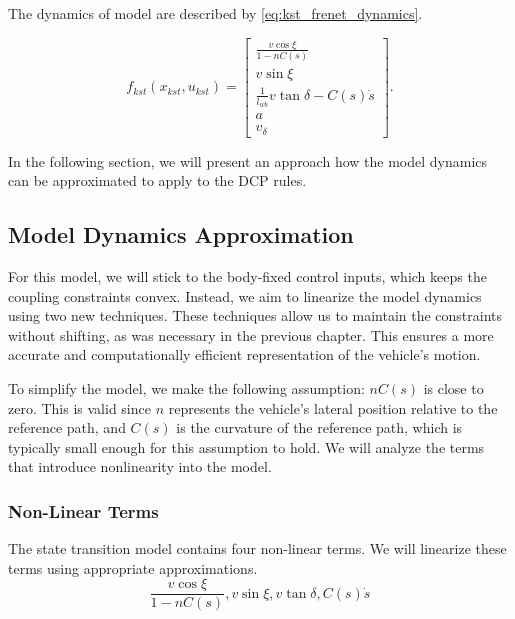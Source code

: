The dynamics of model are described by \eqref{eq:kst_frenet_dynamics}.

\begin{equation}
	f_{kst}(x_{kst}, u_{kst}) =
	\begin{bmatrix}
		\frac{v \cos\xi}{1 - nC(s)}                \\[8pt]
		v \sin\xi                                  \\[8pt]
		\frac{1}{l_{wb}}v \tan\delta - C(s)\dot{s} \\[8pt]
		a                                          \\[8pt]
		v_\delta
	\end{bmatrix}.
	\label{eq:kst_frenet_dynamics}
\end{equation}

In the following section, we will present an approach how the model dynamics can be approximated to apply to the DCP rules.

\subsection{Model Dynamics Approximation} \label{subsec:approximation_of_model_dynamics}

For this model, we will stick to the body-fixed control inputs, which keeps the coupling constraints convex.
Instead, we aim to linearize the model dynamics using two new techniques.
These techniques allow us to maintain the constraints without shifting, as was necessary in the previous chapter.
This ensures a more accurate and computationally efficient representation of the vehicle's motion.

To simplify the model, we make the following assumption: $nC(s)$ is close to zero.
This is valid since $n$ represents the vehicle's lateral position relative to the reference path, and $C(s)$ is the curvature of the reference path,
which is typically small enough for this assumption to hold.
We will analyze the terms that introduce nonlinearity into the model.

\subsubsection{Non-Linear Terms}

The state transition model contains four non-linear terms.
We will linearize these terms using appropriate approximations.
\[
	\frac{v \cos\xi}{1 - nC(s)} ,
	v \sin\xi                   ,
	v \tan\delta                ,
	C(s)\dot{s}
\]

